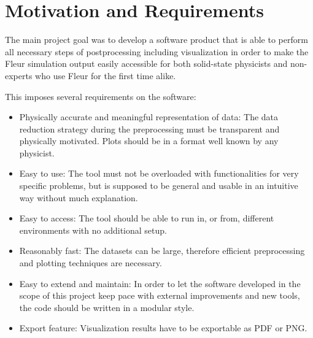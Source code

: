 


\section{Motivation and Requirements}
\label{sec:motiv-requ}

The main project goal was to develop a software product that is able to perform
all necessary steps of postprocessing including visualization in order to make
the Fleur simulation output easily accessible for both solid-state physicists
and non-experts who use Fleur for the first time alike. 

This imposes several requirements on the software:
\begin{itemize}
    \item Physically accurate and meaningful representation of data: The data reduction strategy during the preprocessing must be transparent and physically motivated. Plots should be in a format well known by any physicist.
    \item Easy to use: The tool must not be overloaded with functionalities for very specific problems, but is supposed to be general and usable in an intuitive way without much explanation.
    \item Easy to access: The tool should be able to run in, or from, different environments with no additional setup.
    \item Reasonably fast: The datasets can be large, therefore efficient preprocessing and plotting techniques are necessary.
    \item Easy to extend and maintain: In order to let the software developed in
        the scope of this project keep pace with external improvements and new
        tools, the code should be written in a modular style.
    \item Export feature: Visualization results have to be exportable as PDF or PNG.
\end{itemize}

